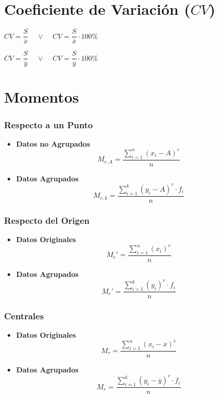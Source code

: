 \documentclass[10pt,letterpaper]{article}
\begin{document}
\section{Coeficiente de Variación ($CV$)}
\begin{multicols}{2}
\begin{center}
$CV=\dfrac{S}{\overline{x}} \phantom{xx}\vee\phantom{xx} 	CV=\dfrac{S}{\overline{x}}\cdot 100\%$
\end{center}
\columnbreak
\begin{center}
$CV=\dfrac{S}{\overline{y}} \phantom{xx}\vee\phantom{xx} 	CV=\dfrac{S}{\overline{y}}\cdot 100\%$
\end{center}
\end{multicols}
\section{Momentos}

\begin{multicols}{3}
\subsubsection*{Respecto a un Punto}
\begin{itemize}
\item \textbf{Datos no Agrupados}
$$M_{r,A}=\dfrac{\displaystyle\sum_{i=1}^{n}(x_i-A)^r}{n}$$
\item \textbf{Datos Agrupados}
$$M_{r,k}=\dfrac{\displaystyle\sum_{i=1}^{k}(y_i-A)^r\cdot f_i}{n}$$
\end{itemize}
\columnbreak
\subsubsection*{Respecto del Origen}
\begin{itemize}
\item \textbf{Datos Originales}
$$M_r'=\dfrac{\displaystyle\sum_{i=1}^{n}(x_i)^r}{n}$$
\item \textbf{Datos Agrupados}
$$M_r'=\dfrac{\displaystyle\sum_{i=1}^{k}(y_i)^r\cdot f_i}{n}$$
\end{itemize}
\columnbreak
\subsubsection*{Centrales}
\begin{itemize}
\item \textbf{Datos Originales}
$$M_r=\dfrac{\displaystyle\sum_{i=1}^{n}(x_i-\overline{x})^r}{n}$$
\item \textbf{Datos Agrupados}
$$M_r=\dfrac{\displaystyle\sum_{i=1}^{k}(y_i-\overline{y})^r\cdot f_i}{n}$$
\end{itemize}
\end{multicols}
\end{document}
